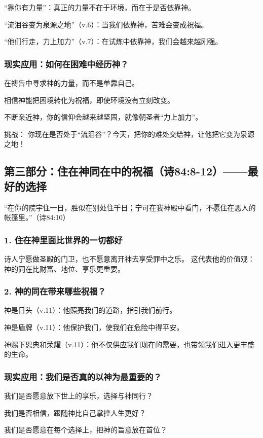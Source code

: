 \documentclass[a4paper, 12pt]{article}
\begin{document}
\hspace{0.6cm}“靠你有力量”：真正的力量不在于环境，而在于是否依靠神。

“流泪谷变为泉源之地”（v.6）：当我们依靠神，苦难会变成祝福。

“他们行走，力上加力”（v.7）：在试炼中依靠神，我们会越来越刚强。

\subsubsection*{现实应用：如何在困难中经历神？}
\hspace{0.6cm}在祷告中寻求神的力量，而不是单靠自己。

相信神能把困境转化为祝福，即使环境没有立刻改变。

不断亲近神，你的信仰会越来越坚固，就像朝圣者“力上加力”。

挑战： 你现在是否处于“流泪谷”？今天，把你的难处交给神，让他把它变为泉源之地！
\subsection*{第三部分：住在神同在中的祝福（诗84:8-12）——最好的选择}
“在你的院宇住一日，胜似在别处住千日；宁可在我神殿中看门，不愿住在恶人的帐篷里。”（诗84:10）
\subsubsection*{1. 住在神里面比世界的一切都好}
诗人宁愿做圣殿的门卫，也不愿意离开神去享受罪中之乐。
这代表他的价值观：神的同在比财富、地位、享乐更重要。
\subsubsection*{2. 神的同在带来哪些祝福？}
\hspace{0.6cm}神是日头（v.11）：他照亮我们的道路，指引我们前行。

神是盾牌（v.11）：他保护我们，使我们在危险中得平安。

神赐下恩典和荣耀（v.11）：他不仅供应我们现在的需要，也带领我们进入更丰盛的生命。
\subsubsection*{现实应用：我们是否真的以神为最重要的？}
\hspace{0.6cm}我们是否愿意放下世上的享乐，选择与神同行？

我们是否相信，跟随神比自己掌控人生更好？

我们是否愿意在每个选择上，把神的旨意放在首位？
\end{document}
